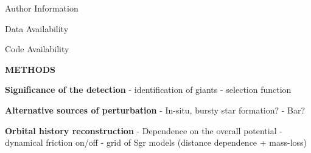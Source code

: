 \documentclass{natureprintstyle}
\begin{document}
\begin{addendum}
\item[Author  Information]  

\item[Data Availability] 
    
\item[Code Availability] 
    
\end{addendum}



\pagebreak

\setcounter{page}{1}
\setcounter{figure}{0}
\setcounter{table}{0}
\captionsetup[figure]{labelformat=empty}
\renewcommand{\thefigure}{Extended Data \arabic{figure}}
\renewcommand{\thetable}{Extended Data \arabic{table}}

\begin{center}
{\bf \Large \uppercase{Methods}}
\end{center}

\noindent
{\bf Significance of the detection}
- identification of giants
- selection function

{\bf Alternative sources of perturbation}
- In-situ, bursty star formation?
- Bar?

{\bf Orbital history reconstruction}
- Dependence on the overall potential
- dynamical friction on/off
- grid of Sgr models (distance dependence + mass-loss)
\end{document}
